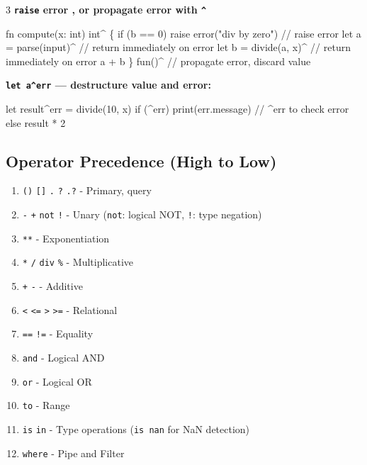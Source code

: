 \documentclass[8pt,landscape,a4paper,oneside]{article}
\newenvironment{Shaded}{%
  \begin{snugshade}%
  \vspace{0.4\baselineskip}%
  \fontsize{9}{10}\selectfont%
  \setlength{\parskip}{0pt}%
  \setlength{\topsep}{0pt}%
  \setlength{\partopsep}{0pt}%
}{%
  \vspace{0.01\baselineskip}%
  \end{snugshade}%
}
\providecommand{\tightlist}{%
  \setlength{\itemsep}{0pt}\setlength{\parskip}{0pt}}
\newcommand{\NormalTok}[1]{#1}
\begin{document}
\begin{multicols*}{3}
\textbf{\texttt{raise} error , or propagate error with \texttt{\^{}}}

\begin{Shaded}
\begin{Highlighting}[]
\NormalTok{fn compute(x: int) int\^{} \{}
\NormalTok{  if (b == 0) raise error("div by zero")  // raise error}
\NormalTok{  let a = parse(input)\^{}    // return immediately on error}
\NormalTok{  let b = divide(a, x)\^{}    // return immediately on error}
\NormalTok{  a + b}
\NormalTok{\}}
\NormalTok{fun()\^{}               // propagate error, discard value}
\end{Highlighting}
\end{Shaded}

\textbf{\texttt{let\ a\^{}err} --- destructure value and error:}

\begin{Shaded}
\begin{Highlighting}[]
\NormalTok{let result\^{}err = divide(10, x)}
\NormalTok{if (\^{}err) print(err.message)  // \^{}err to check error}
\NormalTok{else result * 2}
\end{Highlighting}
\end{Shaded}

\subsection{Operator Precedence (High to
Low)}\label{operator-precedence-high-to-low}

\begin{enumerate}
\def\labelenumi{\arabic{enumi}.}
\tightlist
\item
  \texttt{()} \texttt{{[}{]}} \texttt{.} \texttt{?} \texttt{.?} -
  Primary, query
\item
  \texttt{-} \texttt{+} \texttt{not} \texttt{!} - Unary (\texttt{not}:
  logical NOT, \texttt{!}: type negation)
\item
  \texttt{**} - Exponentiation
\item
  \texttt{*} \texttt{/} \texttt{div} \texttt{\%} - Multiplicative
\item
  \texttt{+} \texttt{-} - Additive
\item
  \texttt{\textless{}} \texttt{\textless{}=} \texttt{\textgreater{}}
  \texttt{\textgreater{}=} - Relational
\item
  \texttt{==} \texttt{!=} - Equality
\item
  \texttt{and} - Logical AND
\item
  \texttt{or} - Logical OR
\item
  \texttt{to} - Range
\item
  \texttt{is} \texttt{in} - Type operations (\texttt{is\ nan} for NaN
  detection)
\item
  \texttt{\textbar{}} \texttt{where} - Pipe and Filter
\end{enumerate}


\end{multicols*}
\end{document}
